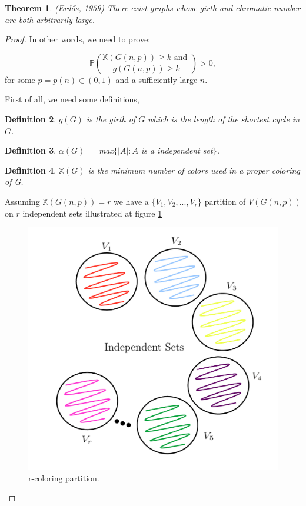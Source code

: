 \documentclass[12pt,twoside,a4paper]{book}
\numberwithin{equation}{section}
\newtheorem{theorem}             {Theorem}[section]
\newtheorem{definition}	[theorem] {Definition}
\theoremstyle{remark}
\begin{document}
\begin{theorem}(Erd\H{o}s, 1959) There exist graphs whose girth and chromatic number are both arbitrarily large.
\end{theorem}
\begin{proof}
In other words, we need to prove:

$$\mathbb{P}\binom{\mathbb{X}(G(n,p)) \geq k \text{ and }} {g(G(n,p)) \geq k} > 0 ,$$
for some $p =p(n) \in (0,1)$ and a sufficiently large $n$.

First of all, we need some definitions,
\begin{definition}
$g(G)$ is the girth of $G$ which is the length of the shortest cycle in $G$. 
\end{definition}
\begin{definition}
$\alpha(G) =$ max$\{|A|: A$ is a independent set$\}$.
\end{definition}
\begin{definition}
$\mathbb{X}(G)$ is the minimum number of colors used in a proper coloring of G.
\end{definition}
Assuming $\mathbb{X}(G(n,p)) = r$ we have a $\{V_1,V_2,...,V_r\}$ partition of $V(G(n,p))$ on $r$ independent sets illustrated at figure \ref{fig:r-partition}

\begin{figure}[!htb]
     \centering
     \includegraphics[scale=1]{Figuras/r-partion.jpg}
     \caption{r-coloring partition. }
     \label{fig:r-partition}
\end{figure}


\end{proof}
\end{document}
